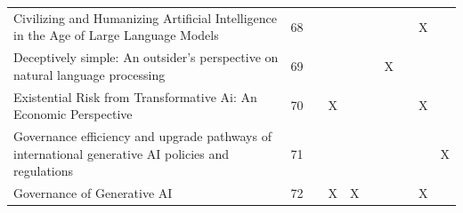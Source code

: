 \begin{landscape}
\begin{longtable}{|p{17cm}|c|c|c|c|c|c|c|c|c|}
		Civilizing and Humanizing Artificial Intelligence in the Age of Large Language Models                                                                   & 68          &                                    &                                                           &                                                       &                                                            &                                           &                                              & X                                                  &                                    \\
		Deceptively simple: An outsider's perspective on natural language processing                                                                            & 69          &                                    &                                                           &                                                       &                                                            & X                                         &                                              &                                                    &                                    \\
		Existential Risk from Transformative Ai: An Economic Perspective                                                                                        & 70          &                                    & X                                                         &                                                       &                                                            &                                           &                                              & X                                                  &                                    \\
		Governance efficiency and upgrade pathways of international generative AI policies and regulations                                                      & 71          &                                    &                                                           &                                                       &                                                            &                                           &                                              &                                                    & X                                  \\
		Governance of Generative AI                                                                                                                             & 72          &                                    & X                                                         & X                                                     &                                                            &                                           &                                              & X                                                  &                                    \\

\end{longtable}
\end{landscape}
